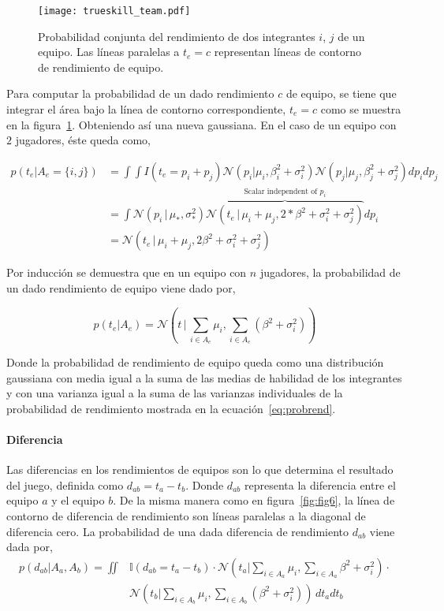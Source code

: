 \documentclass[11pt,twoside,spanish]{report} %
\begin{document}
\begin{figure}[H]
	\centering
	\texttt{[image: trueskill\_team.pdf]}
	\caption{Probabilidad conjunta del rendimiento de dos integrantes $i$, $j$ de un equipo. Las l\'ineas paralelas a $t_e=c$ representan l\'ineas de contorno de rendimiento de equipo.}
	\label{fig:fig9}
\end{figure}

Para computar la probabilidad de un dado rendimiento $c$ de equipo, se tiene que integrar el \'area bajo la l\'inea de contorno correspondiente, $ t_e = c $ como se muestra en la figura~\ref{fig:fig9}.
Obteniendo as\'i una nueva gaussiana.
En el caso de un equipo con $2$ jugadores, \'este queda como,


\begin{equation}
\begin{split}
p(t_e|A_e=\{i,j\}) & =\int\int I(t_e=p_i+p_j)\mathcal{N}(p_i \vert \mu_i,\beta_i^2+\sigma_i^2)\mathcal{N}(p_j \vert \mu_j,\beta_j^2+\sigma_j^2)dp_idp_j\\
  & = \int \mathcal{N}(p_i\,|\,\mu_{*},\sigma_{*}^2) \overbrace{\mathcal{N}(t_e\,|\,\mu_i+\mu_j,2*\beta^2 + \sigma_i^2 + \sigma_j^2)}^{\text{Scalar independent of $p_i$}} dp_i \\[0.3cm]
& = \mathcal{N}(t_e \,|\, \mu_i+\mu_j,2\beta^2 + \sigma_i^2 + \sigma_j^2)
\end{split}
\end{equation}

Por inducci\'on se demuestra que en un equipo con $n$ jugadores, la probabilidad de un dado rendimiento de equipo viene dado por,

\begin{equation}
p(t_e|A_e) = \mathcal{N}\left(t\,|\,\sum_{i\in A_e} \mu_i,\sum_{i\in A_e} (\beta^2 + \sigma_i^2)\right)
\end{equation}

Donde la probabilidad de rendimiento de equipo queda como una distribuci\'on gaussiana con media igual a la suma de las medias de habilidad de los integrantes y con una varianza igual a la suma de las varianzas individuales de la probabilidad de rendimiento mostrada en la ecuaci\'on~\ref{eq:probrend}.


\paragraph{Diferencia}

Las diferencias en los rendimientos de equipos son lo que determina el resultado del juego, definida como $d_{ab}=t_a - t_b$.
Donde $d_{ab}$ representa la diferencia entre el equipo $a$ y el equipo $b$.
De la misma manera como en figura~\ref{fig:fig6}, la l\'inea de contorno de diferencia de rendimiento son l\'ineas paralelas a la diagonal de diferencia cero.
La probabilidad de una dada diferencia de rendimiento $d_ {ab}$ viene dada por,
\begin{align}\label{eq:mensajeCum}
p(d_{ab}|A_a,A_b) = \iint & \mathbb{I}(d_{ab}=t_a -t_b)\cdot \mathcal{N}(t_a|\sum_{i\in A_a} \mu_i,\sum_{i\in A_a} \beta^2 + \sigma_i^2) \cdot \nonumber \\
& \mathcal{N}(t_b|\sum_{i\in A_b} \mu_i,\sum_{i\in A_b} (\beta^2 + \sigma_i^2)) \, dt_a dt_b
\end{align}
\end{document}
